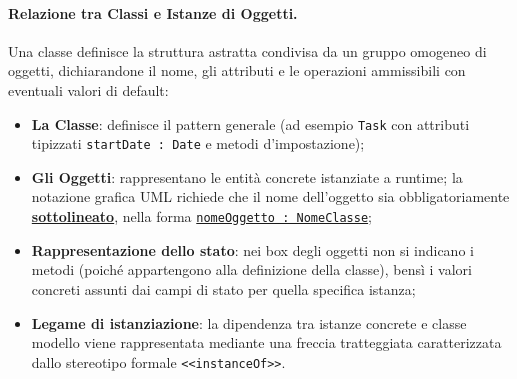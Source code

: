 \documentclass[12pt]{extarticle}
\newcommand{\cn}[1]{\makebox[\linewidth][c]{\textbf{#1}}}
\begin{document}
\begin{figure}[htbp]
    \centering
{}
    \label{fig:association_class_auth}
\end{figure}

\paragraph{Relazione tra Classi e Istanze di Oggetti.}
Una classe definisce la struttura astratta condivisa da un gruppo omogeneo di oggetti, dichiarandone il nome, gli attributi e le operazioni ammissibili con eventuali valori di default:
\begin{itemize}
    \item \textbf{La Classe}: definisce il pattern generale (ad esempio \texttt{Task} con attributi tipizzati \texttt{startDate : Date} e metodi d'impostazione);
    \item \textbf{Gli Oggetti}: rappresentano le entità concrete istanziate a runtime; la notazione grafica UML richiede che il nome dell'oggetto sia obbligatoriamente \underline{\textbf{sottolineato}}, nella forma \texttt{\underline{nomeOggetto : NomeClasse}};
    \item \textbf{Rappresentazione dello stato}: nei box degli oggetti non si indicano i metodi (poiché appartengono alla definizione della classe), bensì i valori concreti assunti dai campi di stato per quella specifica istanza;
    \item \textbf{Legame di istanziazione}: la dipendenza tra istanze concrete e classe modello viene rappresentata mediante una freccia tratteggiata caratterizzata dallo stereotipo formale \texttt{<<instanceOf>>}.
\end{itemize}
\end{document}
